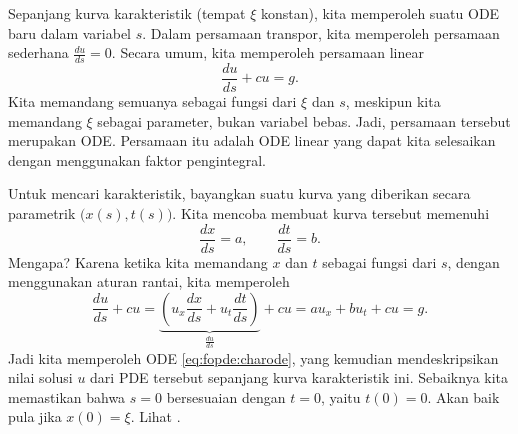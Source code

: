Sepanjang kurva karakteristik (tempat $\xi$ konstan), kita memperoleh suatu
ODE baru dalam variabel $s$.  Dalam persamaan
transpor, kita memperoleh persamaan sederhana $\frac{du}{ds} = 0$.  Secara umum,
kita memperoleh persamaan linear
\begin{equation} \label{eq:fopde:charode}
\frac{du}{ds} + c u = g.
\end{equation}
Kita memandang semuanya sebagai fungsi dari $\xi$ dan $s$,
meskipun
kita memandang $\xi$ sebagai parameter, bukan variabel bebas.
Jadi, persamaan tersebut merupakan ODE\@.  Persamaan itu adalah ODE
linear yang dapat kita selesaikan dengan menggunakan faktor pengintegral.

Untuk mencari karakteristik, bayangkan suatu kurva yang diberikan secara parametrik
$\bigl(x(s),t(s)\bigr)$.  Kita mencoba membuat kurva tersebut memenuhi
\begin{equation*}
\frac{dx}{ds} = a, \qquad \frac{dt}{ds} = b .
\end{equation*}
Mengapa?
Karena ketika kita memandang $x$ dan $t$ sebagai fungsi dari $s$, dengan menggunakan
aturan rantai, kita memperoleh
\begin{equation*}
\frac{du}{ds} + c u =
\underbrace{\left( u_x \frac{dx}{ds} + u_t
\frac{dt}{ds}\right)}_{\frac{du}{ds}} + c u =
a u_x + b u_t + c u = g .
\end{equation*}
Jadi kita memperoleh ODE \eqref{eq:fopde:charode}, yang
kemudian mendeskripsikan nilai solusi $u$ dari
PDE tersebut sepanjang
kurva karakteristik ini.
Sebaiknya kita memastikan bahwa $s=0$
bersesuaian dengan $t=0$, yaitu $t(0) = 0$.  Akan baik pula jika
$x(0) = \xi$.
Lihat .

\begin{myfig}
\capstart
{}
\caption{Kurva karakteristik umum.\label{fopde:charcurvecurvy}}
\end{myfig}


